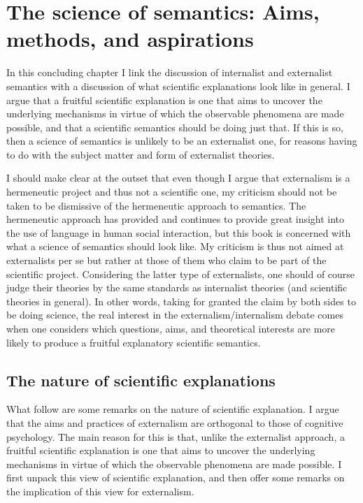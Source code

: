 \chapter{The science of semantics: Aims, methods, and aspirations}
In this concluding chapter I link the discussion of internalist and externalist semantics with a discussion of what scientific explanations look like in general. I argue that a fruitful scientific explanation is one that aims to uncover the underlying mechanisms in virtue of which the observable phenomena are made possible, and that a scientific semantics should be doing just that. If this is so, then a science of semantics is unlikely to be an externalist one, for reasons having to do with the subject matter and form of externalist theories.

I should make clear at the outset that even though I argue that externalism is a hermeneutic project and thus not a scientific one, my criticism should not be taken to be dismissive of the hermeneutic approach to semantics. The hermeneutic approach has provided and continues to provide great insight into the use of language in human social interaction, but this book is concerned with what a science of semantics should look like. My criticism is thus not aimed at externalists per se but rather at those of them who claim to be part of the scientific project. Considering the latter type of externalists, one should of course judge their theories by the same standards as internalist theories (and scientific theories in general). In other words, taking for granted the claim by both sides to be doing science, the real interest in the externalism/internalism debate comes when one considers which questions, aims, and theoretical interests are more likely to produce a fruitful explanatory scientific semantics.


\section{The nature of scientific explanations}
What follow are some remarks on the nature of scientific explanation. I argue that the aims and practices of externalism are orthogonal to those of cognitive psychology. The main reason for this is that, unlike the externalist approach, a fruitful scientific explanation is one that aims to uncover the underlying mechanisms in virtue of which the observable phenomena are made possible. I first unpack this view of scientific explanation, and then offer some remarks on the implication of this view for externalism.

